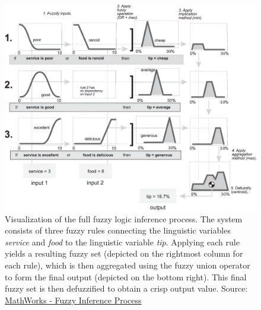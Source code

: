 \begin{figure}[H]
      \centering
      \includegraphics[width=1\columnwidth]{figures/TheoreticalBackground/FullInferenceProcess.png}
      \caption[Visualization of the full fuzzy logic inference process.]
      {Visualization of the full fuzzy logic inference process. The system consists of three fuzzy rules connecting the linguistic variables \emph{service} and \emph{food} to the linguistic variable \emph{tip}. Applying each rule yields a resulting fuzzy set (depicted on the rightmost column for each rule), which is then aggregated using the fuzzy union operator to form the final output (depicted on the bottom right). This final fuzzy set is then defuzzified to obtain a crisp output value. \small{Source: \href{https://de.mathworks.com/help/fuzzy/fuzzy-inference-process.html}{MathWorks - Fuzzy Inference Process}}}
      \label{fig:fuzzy_inference_full}
\end{figure}